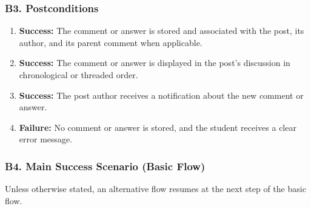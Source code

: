 \documentclass[12pt]{article}
\begin{document}
\hypertarget{sec:b3-postconditions}{}
\subsubsection*{B3. Postconditions}
\par\medskip

\begin{enumerate}
\item \textbf{Success:} The comment or answer is stored and associated with the post, its author, and its parent comment when applicable.
\item \textbf{Success:} The comment or answer is displayed in the post's discussion in chronological or threaded order.
\item \textbf{Success:} The post author receives a notification about the new comment or answer.
\item \textbf{Failure:} No comment or answer is stored, and the student receives a clear error message.
\end{enumerate}
\par\medskip

\hypertarget{sec:b4-main-success-scenario-basic-flow}{}
\subsubsection*{B4. Main Success Scenario (Basic Flow)}
\par\medskip

Unless otherwise stated, an alternative flow resumes at the next step of the basic flow.
\par\medskip
\end{document}
